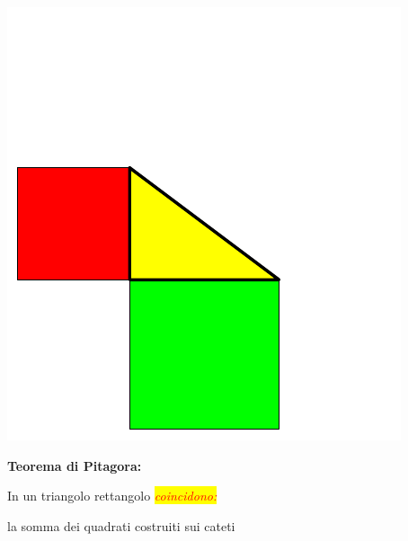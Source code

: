 \documentclass[italian,landscape]{report}
\newcommand{\rosso}[1]{\textcolor{red}{#1}}
\newcommand{\sfondogiallo}[1]{\colorbox{yellow}{#1}}
\begin{document}
\begin{center}
\includegraphics[scale=1.2]{pitagora2}
\end{center}

\begin{firstheadlineitemize}

\item \textbf{Teorema di Pitagora:}

\begin{secondheadlineitemize}

\item  In un triangolo rettangolo \sfondogiallo{\rosso{\textit{coincidono:}}}

\begin{thirdheadlineitemize}

\item la somma dei quadrati costruiti sui cateti

\end{thirdheadlineitemize}

\end{secondheadlineitemize}

\end{firstheadlineitemize}

\newframe
\end{document}
